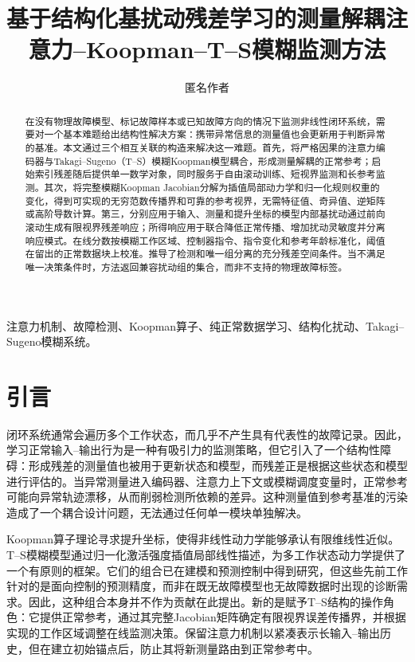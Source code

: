 \documentclass[journal]{IEEEtran}
\title{基于结构化基扰动残差学习的测量解耦注意力--Koopman--T--S模糊监测方法}
\author{匿名作者}
\newcommand{\1}{\bm 1}
\begin{document}
\maketitle

\begin{abstract}
在没有物理故障模型、标记故障样本或已知故障方向的情况下监测非线性闭环系统，需要对一个基本难题给出结构性解决方案：携带异常信息的测量值也会更新用于判断异常的基准。本文通过三个相互关联的构造来解决这一难题。首先，将严格因果的注意力编码器与Takagi--Sugeno（T--S）模糊Koopman模型耦合，形成测量解耦的正常参考；启始索引残差随后提供单一数学对象，同时服务于自由滚动训练、短视界监测和长参考监测。其次，将完整模糊Koopman Jacobian分解为插值局部动力学和归一化规则权重的变化，得到可实现的无穷范数传播界和可靠的参考视界，无需特征值、奇异值、逆矩阵或高阶导数计算。第三，分别应用于输入、测量和提升坐标的模型内部基扰动通过前向滚动生成有限视界残差响应；所得响应用于联合降低正常传播、增加扰动灵敏度并分离响应模式。在线分数按模糊工作区域、控制器指令、指令变化和参考年龄标准化，阈值在留出的正常数据块上校准。推导了检测和唯一组分离的充分残差空间条件。当不满足唯一决策条件时，方法返回兼容扰动组的集合，而非不支持的物理故障标签。
\end{abstract}

\begin{IEEEkeywords}
注意力机制、故障检测、Koopman算子、纯正常数据学习、结构化扰动、Takagi--Sugeno模糊系统。
\end{IEEEkeywords}

\section{引言}
闭环系统通常会遍历多个工作状态，而几乎不产生具有代表性的故障记录。因此，学习正常输入--输出行为是一种有吸引力的监测策略，但它引入了一个结构性障碍：形成残差的测量值也被用于更新状态和模型，而残差正是根据这些状态和模型进行评估的。当异常测量进入编码器、注意力上下文或模糊调度变量时，正常参考可能向异常轨迹漂移，从而削弱检测所依赖的差异。这种测量值到参考基准的污染造成了一个耦合设计问题，无法通过任何单一模块单独解决。

Koopman算子理论寻求提升坐标，使得非线性动力学能够承认有限维线性近似\cite{brunton2016,lusch2018}。T--S模糊模型通过归一化激活强度插值局部线性描述，为多工作状态动力学提供了一个有原则的框架\cite{takagi1985,tanaka2001,lam2018}。它们的组合已在建模和预测控制中得到研究\cite{hu2026}，但这些先前工作针对的是面向控制的预测精度，而非在既无故障模型也无故障数据时出现的诊断需求。因此，这种组合本身并不作为贡献在此提出。新的是赋予T--S结构的操作角色：它提供正常参考，通过其完整Jacobian矩阵确定有限视界误差传播界，并根据实现的工作区域调整在线监测决策。保留注意力机制以紧凑表示长输入--输出历史，但在建立初始锚点后，防止其将新测量路由到正常参考中。
\end{document}
